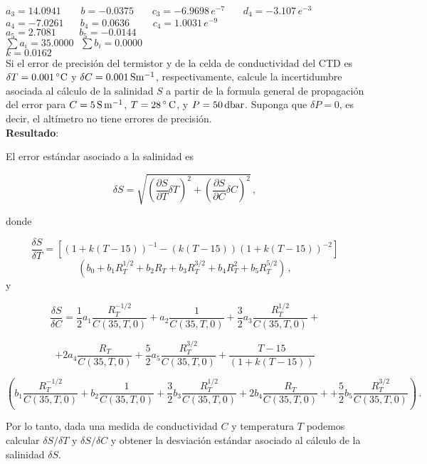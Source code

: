 \documentclass[
]{agujournal2019}
\begin{document}
\(a_3=14.0941\,\,\,\,\,\,\,\,\,\,\,\,b=-0.0375\,\,\,\,\,\,\,\,\,\,\,c_3=-6.9698\,e^{-7}\,\,\,\,\,\,\,\,\,\,\,d_4=-3.107\,e^{-3}\)
~
\(a_4=-7.0261\,\,\,\,\,\,\,\,\,\,b_4=0.0636\,\,\,\,\,\,\,\,\,\,\,\,\,\,c_4=1.0031\,e^{-9}\)\\

\(a_5=2.7081\,\,\,\,\,\,\,\,\,\,\,\,\,\,b_5=-0.0144\,\,\,\,\,\,\,\,\,\,\,\,\,\,\,\,\,\,\,\,\,\,\,\,\,\)\\

\(\sum a_i=35.0000\,\,\,\,\sum b_i=0.0000\)\\

\(k=0.0162\)\\

\noindent Si el error de precisión del termistor y de la celda de
conductividad del CTD es \(\delta{T}=0.001\,^\circ{\rm C}\) y
\(\delta{C}=0.001\,{\rm S}{\rm m}^{-1}\), respectivamente, calcule la
incertidumbre asociada al cálculo de la salinidad \(S\) a partir de la
formula general de propagación del error para
\(C=5\,{\rm S}\,{\rm m}^{-1}\), \(T=28\,^\circ\,{\rm C}\), y
\(P=50\,{\rm dbar}\). Suponga que \(\delta{P}=0\), es decir, el
altímetro no tiene errores de precisión.\\

\textbf{Resultado}:

\noindent El error estándar asociado a la salinidad es

\[\delta{S}=\sqrt{\left( \frac{\partial{S}}{\partial{T}}\delta{T} \right)^2 + \left( \frac{\partial{S}}{\partial{C}}\delta{C}\right)^2}\,,\]

donde

\[\frac{\delta{S}}{\delta{T}}=
      \left[(1+k(T-15))^{-1} - (k(T-15))(1+k(T-15))^{-2}\right]\]
\[\left (b_0+b_1 R_T^{1/2}+b_2 R_T+b_3 R_T^{3/2}+b_4 R_T^{2}+b_5 R_T^{5/2}\right)\,,\]
y

\[\frac{\delta{S}}{\delta{C}}=
                 \frac{1}{2} a_1 \frac{R_T^{-1/2}}{C(35,T,0)} +
         a_2 \frac{1}{C(35,T,0)} +
             \frac{3}{2}a_3 \frac{R_T^{1/2}}{C(35,T,0)}+ \]

\[+2 a_4 \frac{R_T}{C(35,T,0)} +\frac{5}{2} a_5 \frac{R_T^{3/2}}{C(35,T,0)}+\frac{T-15}{(1+k(T-15))}\]

\[\left(b_1 \frac{R_T^{-1/2}}{C(35,T,0)} +
         b_2 \frac{1}{C(35,T,0)} +
             \frac{3}{2}b_3 \frac{R_T^{1/2}}{C(35,T,0)}+
               2 b_4 \frac{R_T}{C(35,T,0)} +
     +\frac{5}{2} b_5 \frac{R_T^{3/2}}{C(35,T,0)}
     \right)\,.\]

\noindent Por lo tanto, dada una medida de conductividad \(C\) y
temperatura \(T\) podemos calcular \({\delta{S}}/{\delta{T}}\) y
\({\delta{S}}/{\delta{C}}\) y obtener la desviación estándar asociado al
cálculo de la salinidad \(\delta{S}\).
\end{document}
